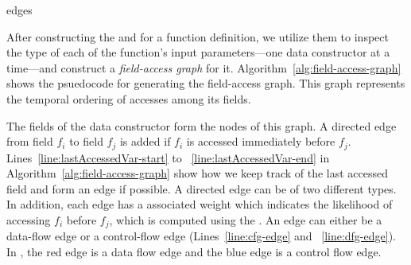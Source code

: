 \begin{algorithm}[t]
\begin{algorithmic}[1]
                \State \Return edges\textquotesingle

            \EndFunction

                

        \end{algorithmic}
    \end{algorithm}


After constructing the \CFG and \DFG for a function definition, we utilize them to inspect the type
of each of the function's input parameters---one data constructor at a time---and construct
a \emph{field-access graph} for it.
Algorithm~\ref{alg:field-access-graph} shows the psuedocode for generating the field-access graph. 
%
This graph represents the temporal ordering of accesses among its fields.

The fields of the data constructor form the nodes of this graph.
%
A directed edge from field $f_i$ to field $f_j$ is added if $f_i$ is accessed immediately before $f_j$. Lines~\ref{line:lastAccessedVar-start} to ~\ref{line:lastAccessedVar-end}
in Algorithm~\ref{alg:field-access-graph} show how we keep track of the last accessed field and form an edge if possible. 
A directed edge can be of two different types. In addition, each edge has a associated weight which indicates the likelihood of accessing $f_i$ before $f_j$, which is computed using the \CFG.
An edge can either be a data-flow edge or a control-flow edge (Lines~\ref{line:cfg-edge} and ~\ref{line:dfg-edge}). In , the red edge is a data flow edge and the blue edge is a control flow edge.

